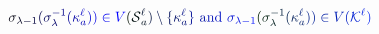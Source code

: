 \documentclass[12pt]{article}
\begin{document}
\makeatletter
\renewcommand*{\@textcolor}[3]{%
  \protect\leavevmode
  \begingroup
    \color#1{#2}#3%
  \endgroup
}
\makeatother
\begin{displaymath}
\mathcolor[RGB]{0,0,15}{\sigma} _ { \mathcolor[RGB]{0,0,30}{\lambda} \mathcolor[RGB]{0,0,45}{-} \mathcolor[RGB]{0,0,60}{1} } \mathcolor[RGB]{0,0,75}{(} \mathcolor[RGB]{0,0,90}{\sigma} _ { \mathcolor[RGB]{0,0,105}{\lambda} } ^ { \mathcolor[RGB]{0,0,120}{-} \mathcolor[RGB]{0,0,135}{1} } \mathcolor[RGB]{0,0,150}{(} \mathcolor[RGB]{0,0,165}{\kappa} _ { \mathcolor[RGB]{0,0,180}{a} } ^ { \mathcolor[RGB]{0,0,195}{\ell} } \mathcolor[RGB]{0,0,210}{)} \mathcolor[RGB]{0,0,225}{)} \mathcolor[RGB]{0,0,240}{\in} \mathcolor[RGB]{0,0,255}{V} \mathcolor[RGB]{0,15,0}{(} \mathcal { \mathcolor[RGB]{0,15,15}{S} } _ { \mathcolor[RGB]{0,15,30}{a} } ^ { \mathcolor[RGB]{0,15,45}{\ell} } \mathcolor[RGB]{0,15,60}{)} \mathcolor[RGB]{0,15,75}{\setminus} \mathcolor[RGB]{0,15,90}{\{} \mathcolor[RGB]{0,15,105}{\kappa} _ { \mathcolor[RGB]{0,15,120}{a} } ^ { \mathcolor[RGB]{0,15,135}{\ell} } \mathcolor[RGB]{0,15,150}{\}} \mathrm { ~ \mathcolor[RGB]{0,15,165}{a} \mathcolor[RGB]{0,15,180}{n} \mathcolor[RGB]{0,15,195}{d} ~ } \mathcolor[RGB]{0,15,210}{\sigma} _ { \mathcolor[RGB]{0,15,225}{\lambda} \mathcolor[RGB]{0,15,240}{-} \mathcolor[RGB]{0,15,255}{1} } \mathcolor[RGB]{0,30,0}{(} \mathcolor[RGB]{0,30,15}{\sigma} _ { \mathcolor[RGB]{0,30,30}{\lambda} } ^ { \mathcolor[RGB]{0,30,45}{-} \mathcolor[RGB]{0,30,60}{1} } \mathcolor[RGB]{0,30,75}{(} \mathcolor[RGB]{0,30,90}{\kappa} _ { \mathcolor[RGB]{0,30,105}{a} } ^ { \mathcolor[RGB]{0,30,120}{\ell} } \mathcolor[RGB]{0,30,135}{)} \mathcolor[RGB]{0,30,150}{)} \mathcolor[RGB]{0,30,165}{\in} \mathcolor[RGB]{0,30,180}{V} \mathcolor[RGB]{0,30,195}{(} \mathcal { \mathcolor[RGB]{0,30,210}{K} } ^ { \mathcolor[RGB]{0,30,225}{\ell} } \mathcolor[RGB]{0,30,240}{)}
\end{displaymath}
\end{document}
